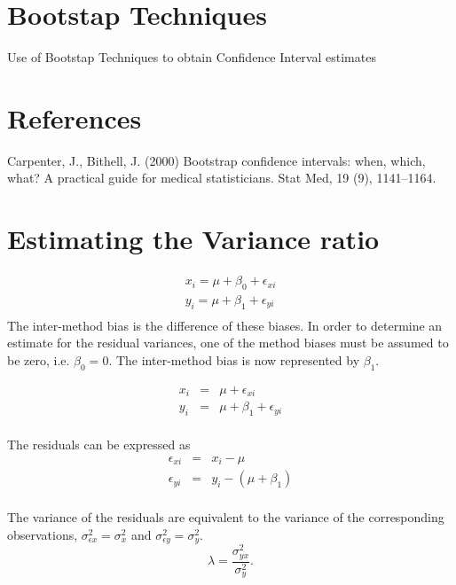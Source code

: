 \documentclass[12pt, a4paper]{report}
\theoremstyle{plain}
\theoremstyle{definition}
\theoremstyle{remark}
\begin{document}
\section{Bootstap Techniques}
Use of Bootstap Techniques to obtain Confidence Interval estimates

\section{References}
Carpenter, J., Bithell, J. (2000) Bootstrap conﬁdence intervals: when, which, what? A practical
guide for medical statisticians. Stat Med, 19 (9), 1141–1164.




\section{Estimating the Variance ratio}
\begin{eqnarray*}
	x_{i} = \mu +  \beta_{0} + \epsilon_{xi}\\
	y_{i} = \mu +  \beta_{1} + \epsilon_{yi}\\
\end{eqnarray*}
The inter-method bias is the difference of these biases. In order to determine an estimate for the residual variances, one of the method biases must be assumed to be zero, i.e. $\beta_{0} = 0$. The inter-method bias is now represented by $\beta_{1}$.

\begin{eqnarray*}
	x_{i} &=& \mu + \epsilon_{xi}\\
	y_{i} &=& \mu +  \beta_{1} + \epsilon_{yi}\\
\end{eqnarray*}

The residuals can be expressed as
\begin{eqnarray*}
	\epsilon_{xi} &=& x_{i} - \mu  \\
	\epsilon_{yi} &=& y_{i} - (\mu + \beta_{1}) \\
\end{eqnarray*}

The variance of the residuals are equivalent to the variance of the corresponding observations, $\sigma^{2}_{\epsilon x} =
\sigma^{2}_{x}$ and $\sigma^{2}_{\epsilon y} = \sigma^{2}_{y}$.
\begin{equation}
\lambda = \frac{\sigma^{2}_{yx}}{\sigma^{2}_{y}}.
\end{equation}
\end{document}
